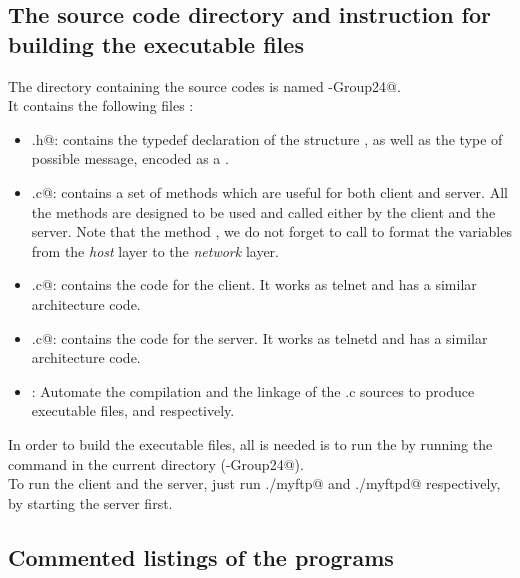 \documentclass{article}
\begin{document}
\subsection{The source code directory and instruction for building the executable files}
The directory containing the source codes is named -Group24@.  \\
It contains the following files : 
\begin{itemize}
\item \verb@header.h@: contains the typedef declaration of the structure \verb@msgHeader@, as well as the type of possible message, encoded as a \verb@int@.
\item \verb@utils.c@: contains a set of methods which are useful for both client and server. All the methods are designed to be used and called either by the client and the server. Note that the method \verb@sendType@, we do not forget to call \verb@htonl@ to format the \verb@int@ variables from the \textit{host} layer to the \textit{network} layer.
\item \verb@myftp.c@: contains the code for the client. It works as telnet and has a similar architecture code.
\item \verb@myftpd.c@: contains the code for the server. It works as telnetd and has a similar architecture code.
\item \verb@Makefile@: Automate the compilation and the linkage of the .c sources to produce executable files, \verb@myftp@ and \verb@myftpd@ respectively.
\end{itemize}
In order to build the executable files, all is needed is to run the \verb@Makefile@ by running the \verb@make@ command in the current directory (-Group24@).\\

To run the client and the server, just run \verb@./myftp@ and \verb@./myftpd@ respectively, by starting the server first.
\subsection{Commented listings of the programs}
\begin{framed}

\end{framed}
\end{document}
